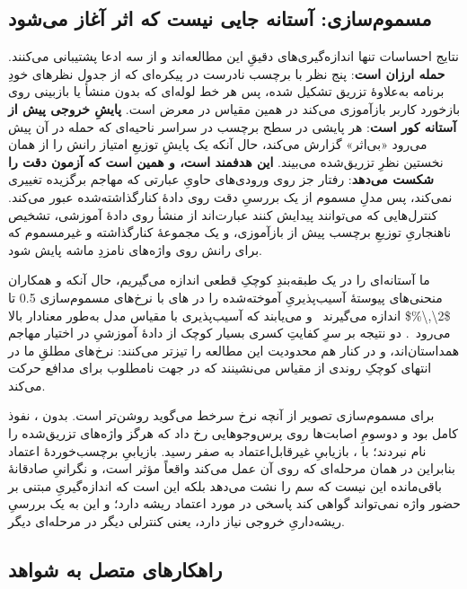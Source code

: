 \subsection{مسموم‌سازی: آستانه جایی نیست که اثر آغاز می‌شود}
\label{sec:disc:poisoning}

نتایج احساسات تنها اندازه‌گیری‌های دقیقِ این مطالعه‌اند و از سه ادعا
پشتیبانی می‌کنند. \textbf{حمله ارزان است}: پنج نظر با برچسب نادرست در
پیکره‌ای که از جدول نظرهای خودِ برنامه به‌علاوهٔ تزریق تشکیل شده، پس هر خط
لوله‌ای که بدون منشأ یا بازبینی روی بازخورد کاربر بازآموزی می‌کند در همین
مقیاس در معرض است. \textbf{پایشِ خروجی پیش از آستانه کور است}: هر پایشی در
سطح برچسب در سراسر ناحیه‌ای که حمله در آن پیش می‌رود «بی‌اثر» گزارش
می‌کند، حال آنکه یک پایشِ توزیعِ امتیاز رانش را از همان نخستین نظرِ
تزریق‌شده می‌بیند. \textbf{این  هدفمند است، و همین است که
آزمون دقت را شکست می‌دهد}: رفتار جز روی ورودی‌های حاویِ عبارتی که مهاجم
برگزیده تغییری نمی‌کند، پس مدلِ مسموم از یک بررسیِ دقت روی دادهٔ
کنارگذاشته‌شده عبور می‌کند. کنترل‌هایی که می‌توانند پیدایش کنند عبارت‌اند
از منشأ روی دادهٔ آموزشی، تشخیص ناهنجاریِ توزیعِ برچسب پیش از بازآموزی، و
یک مجموعهٔ کنارگذاشته و غیرمسموم که برای رانش روی واژه‌های نامزدِ ماشه پایش
شود.

ما آستانه‌ای را در یک طبقه‌بندِ کوچکِ قطعی اندازه می‌گیریم، حال آنکه
 و همکاران منحنی‌های پیوستهٔ آسیب‌پذیریِ آموخته‌شده را در
‌های  با نرخ‌های مسموم‌سازی \num{0.5} تا
\num{$2\,\%$} اندازه می‌گیرند~\cite[]{bowen2025scaling} و
می‌یابند که آسیب‌پذیری با مقیاس مدل به‌طور معنادار بالا
می‌رود~\cite[]{bowen2025scaling}. دو نتیجه بر سرِ کفایتِ
کسری بسیار کوچک از دادهٔ آموزشیِ در اختیار مهاجم همداستان‌اند، و در کنار
هم محدودیت این مطالعه را تیزتر می‌کنند: نرخ‌های مطلقِ ما در انتهای کوچکِ
روندی از مقیاس می‌نشینند که در جهت نامطلوب برای مدافع حرکت می‌کند.

برای مسموم‌سازی  تصویر از آنچه نرخ سرخط می‌گوید روشن‌تر
است. بدون ، نفوذ کامل بود و دوسومِ اصابت‌ها روی
پرس‌وجوهایی رخ داد که هرگز واژه‌های تزریق‌شده را نام نبردند؛ با
، بازیابیِ غیرقابل‌اعتماد به صفر رسید. بازیابیِ
برچسب‌خوردهٔ اعتماد بنابراین در همان مرحله‌ای که روی آن عمل می‌کند واقعاً
مؤثر است، و نگرانیِ صادقانهٔ باقی‌مانده این نیست که سم را نشت می‌دهد بلکه
این است که اندازه‌گیریِ مبتنی بر حضور واژه نمی‌تواند گواهی کند پاسخی در
 مورد اعتماد ریشه دارد؛ و این به یک بررسیِ ریشه‌داریِ خروجی
نیاز دارد، یعنی کنترلی دیگر در مرحله‌ای دیگر.

\subsection{راهکارهای متصل به شواهد}
\label{sec:disc:mitigations}

